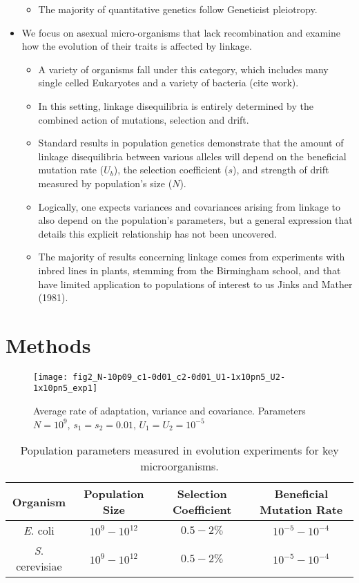\documentclass[12pt,one column]{article}
\begin{document}
\begin{itemize}
\begin{itemize}
	\item The majority of quantitative genetics follow Geneticist pleiotropy.
	\end{itemize}
\item We focus on asexual micro-organisms that lack recombination and examine how the evolution of their traits is affected by linkage.
	\begin{itemize}
	\item A variety of organisms fall under this category, which includes many single celled Eukaryotes and a variety of bacteria (cite work).
	\item In this setting, linkage disequilibria is entirely determined by the combined action of mutations, selection and drift. 
	\item Standard results in population genetics demonstrate that the amount of linkage disequilibria between various alleles will depend on the beneficial mutation rate ($U_b$), the selection coefficient ($s$), and strength of drift measured by population’s size ($N$). 
	\item Logically, one expects variances and covariances arising from linkage to also depend on the population’s parameters, but a general expression that details this explicit relationship has not been uncovered. 
	\item The majority of results concerning linkage comes from experiments with inbred lines in plants, stemming from the Birmingham school, and that have limited application to populations of interest to us Jinks and Mather (1981).
	\end{itemize}

\end{itemize}

\section*{Methods}
\begin{figure}[h]
	\centering
	\texttt{[image: fig2\_N-10p09\_c1-0d01\_c2-0d01\_U1-1x10pn5\_U2-1x10pn5\_exp1]} 
	\caption{Average rate of adaptation, variance and covariance. Parameters $N=10^9$, $s_1=s_2=0.01$, $U_1=U_2=10^{-5}$} 
	\label{fig.1}
\end{figure}
	
\begin{table}[h]
	\centering
 	\begin{tabular}{ | c | c | c | c |}
    \hline
    Organism 												& Population Size 	& Selection Coefficient & Beneficial Mutation Rate \\ \hline
    \textit{E}. coli \cite{Perfeito2007}					& $10^9 - 10^12$ 	& $0.5 - 2 \%$  & $10^{-5} - 10^{-4}$ \\ \hline
    \textit{S}. cerevisiae \cite{desai2007speed,Levy2015}	& $10^9 - 10^12$ 	& $0.5 - 2 \%$  & $10^{-5} - 10^{-4}$ \\
    \hline
	\end{tabular}
	\caption{Population parameters measured in evolution experiments for key microorganisms.} 
	\label{Table 1}
\end{table}
\end{document}
